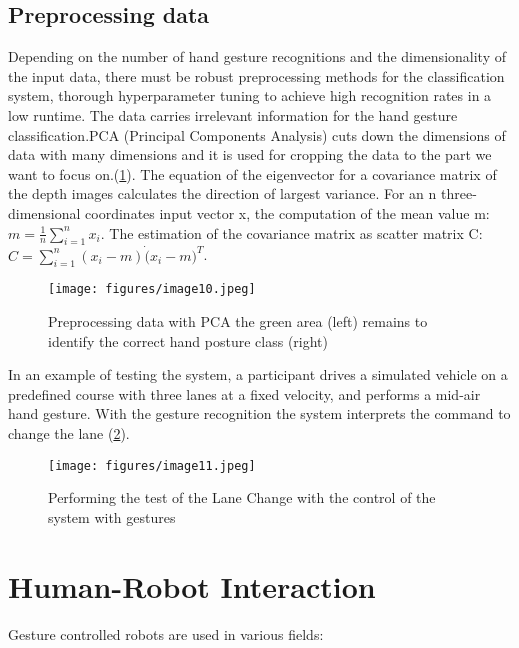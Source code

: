 \documentclass[12pt]{book}
\begin{document}
\subsection{Preprocessing data}\label{subsec:ssec1}
Depending on the number of hand gesture recognitions and the dimensionality of the input data, there must be robust preprocessing methods for the classification system, thorough hyperparameter tuning to achieve high recognition rates in a low runtime. The data carries irrelevant information for the hand gesture classification.PCA (Principal Components Analysis) cuts down the dimensions of data with many dimensions and it is used for cropping the data to the part we want to focus on.(\ref{fig:fig8}). The equation of the eigenvector for a covariance matrix of the depth images calculates the direction of largest variance. For an n three-dimensional coordinates input vector x, the computation of the mean value m: $m=\frac 1 n\sum_{i=1}^n x_i$.
The estimation of  the covariance matrix as scatter matrix C: $C=\sum_{i=1}^n (x_i-m)\dot(x_i-m)^T$.

\begin{figure}[!htbp]
\centering
  \texttt{[image: figures/image10.jpeg]}
  \\
  \caption{Preprocessing data with PCA the green area (left) remains to identify the correct hand posture class (right) 
 \cite{ZEN2018}}
  \label{fig:fig8}
\end{figure}

In an example of testing the system, a participant drives a simulated vehicle on a predefined course with three lanes at a fixed velocity, and performs a mid-air hand gesture. With the gesture recognition the system interprets the command to change the lane (\ref{fig:fig9}). 

\begin{figure}[!htbp]
\centering
  \texttt{[image: figures/image11.jpeg]}
  \\
  \caption{Performing the test of the Lane Change with the control of the system with gestures \cite{ZEN2018}}
  \label{fig:fig9}
\end{figure}

\section{Human-Robot Interaction}
Gesture controlled robots are used in various fields: 
\end{document}
